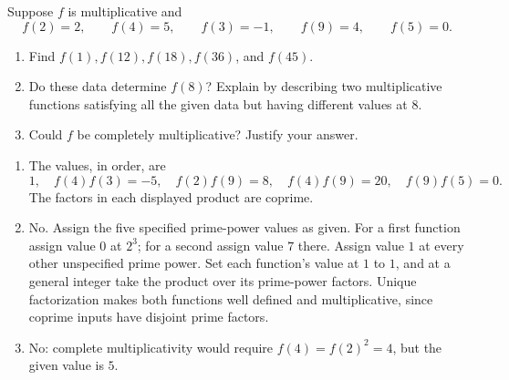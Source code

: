 Suppose $f$ is multiplicative and
\[
 f(2)=2,\qquad f(4)=5,\qquad f(3)=-1,\qquad
 f(9)=4,\qquad f(5)=0.
\]
\begin{enumerate}
  \item Find $f(1),f(12),f(18),f(36)$, and $f(45)$. 
  \item Do these data determine $f(8)$? Explain by describing two
  multiplicative functions satisfying all the given data but having
  different values at $8$. 
  \item Could $f$ be completely multiplicative? Justify your answer.
\end{enumerate}
\begin{solution}
\begin{enumerate}
  \item The values, in order, are
  \[
    1,\quad f(4)f(3)=-5,\quad f(2)f(9)=8,\quad
    f(4)f(9)=20,\quad f(9)f(5)=0.
  \]
  The factors in each displayed product are coprime.
  \item No. Assign the five specified prime-power values as given.
  For a first function assign value $0$ at $2^3$; for a second assign
  value $7$ there. Assign value $1$ at every other unspecified prime
  power. Set each function's value at $1$ to $1$, and at a general
  integer take the product over its prime-power factors. Unique
  factorization makes both functions well defined and multiplicative,
  since coprime inputs have disjoint prime factors.
  \item No: complete multiplicativity would require
  $f(4)=f(2)^2=4$, but the given value is $5$.
\end{enumerate}
\end{solution}

